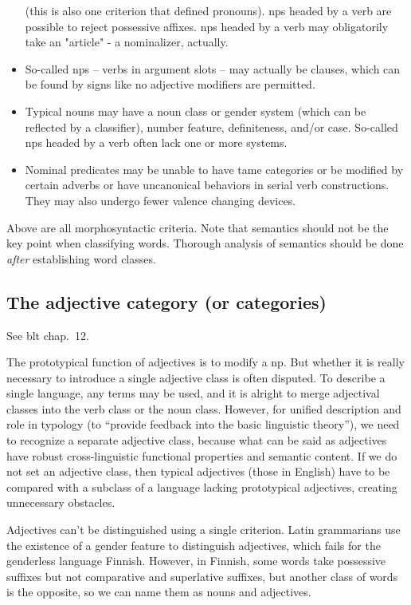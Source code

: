 \documentclass[UTF8, a4paper, oneside, scheme=plain]{ctexart}
\newcommand*{\citechap}[1]{chap.~{#1}}
\begin{document}
\begin{itemize}
    (this is also one criterion that defined pronouns).
    \ac{np}s headed by a verb are possible to reject possessive affixes.
    \ac{np}s headed by a verb may obligatorily take an "article" - a nominalizer, actually.
    \item So-called \ac{np}s -- verbs in argument slots -- 
    may actually be clauses,
    which can be found by signs like no adjective modifiers are permitted.
    \item Typical nouns may have a 
    noun class or gender system (which can be reflected by a classifier), 
    number feature, definiteness, and/or case. 
    So-called \ac{np}s headed by a verb often lack one or more systems. 
    \item Nominal predicates may 
    be unable to have \ac{tame} categories
    or be modified by certain adverbs
    or have uncanonical behaviors in serial verb constructions.
    They may also undergo fewer valence changing devices.
\end{itemize}

Above are all morphosyntactic criteria. Note that semantics should not be the key point when classifying words.
Thorough analysis of semantics should be done \emph{after} establishing word classes.

\subsection{The adjective category (or categories)}

See \ac{blt} \citechap{12}. 

The prototypical function of adjectives is to modify a \ac{np}. 
But whether it is really necessary to introduce a single adjective class is often disputed. 
To describe a single language, any terms may be used, 
and it is alright to merge adjectival classes into the verb class or the noun class. 
However, for unified description and role in typology 
(to ``provide feedback into the basic linguistic theory''), 
we need to recognize a separate adjective class, 
because what can be said as adjectives have robust cross-linguistic functional properties and semantic content. 
If we do not set an adjective class, 
then typical adjectives (those in English) 
have to be compared with a subclass of a language lacking prototypical adjectives, 
creating unnecessary obstacles.

Adjectives can't be distinguished using a single criterion. 
Latin grammarians use the existence of a gender feature to distinguish adjectives, 
which fails for the genderless language Finnish. 
However, in Finnish, some words take possessive suffixes but not comparative and superlative suffixes, 
but another class of words is the opposite, so we can name them as nouns and adjectives.
\end{document}
